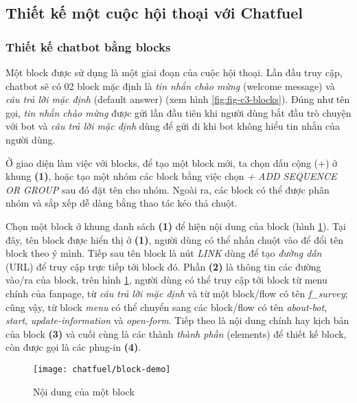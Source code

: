 \subsection{Thiết kế một cuộc hội thoại với Chatfuel}
\subsubsection{Thiết kế chatbot bằng blocks}
Một block được sử dụng là một giai đoạn của cuộc hội thoại. Lần đầu truy cập, chatbot sẽ có 02 block mặc định là \textit{tin nhắn chào mừng} (welcome message) và \textit{câu trả lời mặc định} (default answer) (xem hình \ref{fig:fig-c3-blocks}). Đúng như tên gọi, \textit{tin nhắn chào mừng} được gửi lần đầu tiên khi người dùng bắt đầu trò chuyện với bot và \textit{câu trả lời mặc định} dùng để gửi đi khi bot không hiểu tin nhắn của người dùng.\par
Ở giao diện làm việc với blocks, để tạo một block mới, ta chọn dấu cộng (+) ở khung \textbf{(1)}, hoặc tạo một nhóm các block bằng việc chọn \textit{+ ADD SEQUENCE OR GROUP} sau đó đặt tên cho nhóm. Ngoài ra, các block có thể được phân nhóm và sắp xếp dễ dàng bằng thao tác kéo thả chuột.\par
Chọn một block ở khung danh sách \textbf{(1)} để hiện nội dung của block (hình \ref{fig:fig-c3-block-demo}). Tại đây, tên block được hiển thị ở \textbf{(1)}, người dùng có thể nhấn chuột vào để đổi tên block theo ý mình. Tiếp sau tên block là nút \textit{LINK} dùng để tạo \textit{đường dẫn} (URL) để truy cập trực tiếp tới block đó. Phần \textbf{(2)} là thông tin các đường vào/ra của block, trên hình \ref{fig:fig-c3-block-demo}, người dùng có thể truy cập tới block từ menu chính của fanpage, từ \textit{câu trả lời mặc định} và từ một block/flow có tên \textit{f\_survey}; cũng vậy, từ block \textit{menu} có thể chuyển sang các block/flow có tên \textit{about-bot}, \textit{start}, \textit{update-information} và \textit{open-form}. Tiếp theo là nội dung chính hay kịch bản của block \textbf{(3)} và cuối cùng là các thành \textit{thành phần} (elements) để thiết kế block, còn được gọi là các phug-in \textbf{(4)}.\par
\begin{figure}[htb!]\centering
	\texttt{[image: chatfuel/block-demo]}
	\caption{Nội dung của một block}
	\label{fig:fig-c3-block-demo}
\end{figure}\par

